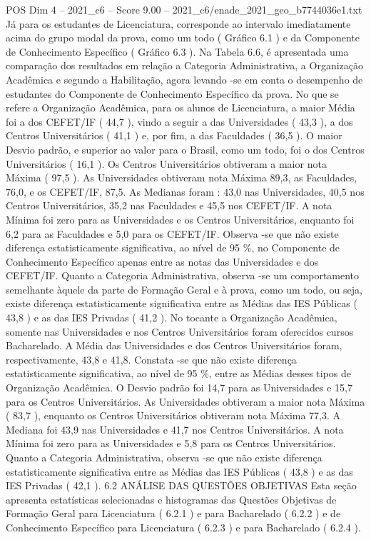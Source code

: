 \begin{textsample}{POS Dim 4 – 2021\_c6 – Score 9.00 – 2021\_c6/enade\_2021\_geo\_b7744036e1.txt}
Já para os estudantes de Licenciatura, corresponde ao intervalo imediatamente acima do grupo modal da prova, como um todo ( Gráfico 6.1 ) e da Componente de Conhecimento Específico ( Gráfico 6.3 ).
Na Tabela 6.6, é apresentada uma comparação dos resultados em relação a Categoria Administrativa, a Organização Acadêmica e segundo a Habilitação, agora levando -se em conta o desempenho de estudantes do Componente de Conhecimento Específico da prova.
No que se refere a Organização Acadêmica, para os alunos de Licenciatura, a maior Média foi a dos CEFET/IF ( 44,7 ), vindo a seguir a das Universidades ( 43,3 ), a dos Centros Universitários ( 41,1 ) e, por fim, a das Faculdades ( 36,5 ).
O maior Desvio padrão, e superior ao valor para o Brasil, como um todo, foi o dos Centros Universitários ( 16,1 ).
Os Centros Universitários obtiveram a maior nota Máxima ( 97,5 ).
As Universidades obtiveram nota Máxima 89,3, as Faculdades, 76,0, e os CEFET/IF, 87,5.
As Medianas foram : 43,0 nas Universidades, 40,5 nos Centros Universitários, 35,2 nas Faculdades e 45,5 nos CEFET/IF.
A nota Mínima foi zero para as Universidades e os Centros Universitários, enquanto foi 6,2 para as Faculdades e 5,0 para os CEFET/IF.
Observa -se que não existe diferença estatisticamente significativa, ao nível de 95 \%, no Componente de Conhecimento Específico apenas entre as notas das Universidades e dos CEFET/IF.
Quanto a Categoria Administrativa, observa -se um comportamento semelhante àquele da parte de Formação Geral e à prova, como um todo, ou seja, existe diferença estatisticamente significativa entre as Médias das IES Públicas ( 43,8 ) e as das IES Privadas ( 41,2 ).
No tocante a Organização Acadêmica, somente nas Universidades e nos Centros Universitários foram oferecidos cursos Bacharelado.
A Média das Universidades e dos Centros Universitários foram, respectivamente, 43,8 e 41,8.
Constata -se que não existe diferença estatisticamente significativa, ao nível de 95 \%, entre as Médias desses tipos de Organização Acadêmica.
O Desvio padrão foi 14,7 para as Universidades e 15,7 para os Centros Universitários.
As Universidades obtiveram a maior nota Máxima ( 83,7 ), enquanto os Centros Universitários obtiveram nota Máxima 77,3.
A Mediana foi 43,9 nas Universidades e 41,7 nos Centros Universitários.
A nota Mínima foi zero para as Universidades e 5,8 para os Centros Universitários.
Quanto a Categoria Administrativa, observa -se que não existe diferença estatisticamente significativa entre as Médias das IES Públicas ( 43,8 ) e as das IES Privadas ( 42,1 ). 6.2 ANÁLISE DAS QUESTÕES OBJETIVAS Esta seção apresenta estatísticas selecionadas e histogramas das Questões Objetivas de Formação Geral para Licenciatura ( 6.2.1 ) e para Bacharelado ( 6.2.2 ) e de Conhecimento Específico para Licenciatura ( 6.2.3 ) e para Bacharelado ( 6.2.4 ).

\end{textsample}
